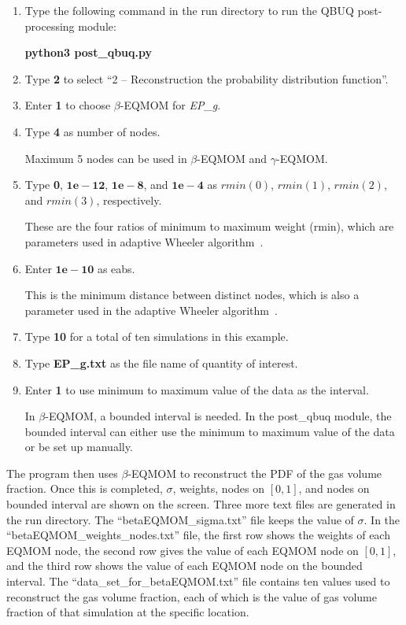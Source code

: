 \documentclass[a4paper,12pt,titlepage]{article}
\begin{document}
\begin{enumerate}[leftmargin=0cm,itemindent=0.5cm]
 \item Type the following command in the run directory to run the QBUQ 
 post-processing module:
 
 \textbf{python3 post\_qbuq.py}
 
 \item Type \textbf{2} to select ``2 -- Reconstruction the probability 
 distribution function''.
 
 \item Enter \textbf{1} to choose $\beta$-EQMOM for \emph{EP\_g}.
 
 \item Type \textbf{4} as number of nodes.
 
 Maximum 5 nodes can be used in $\beta$-EQMOM and $\gamma$-EQMOM.
 
 \item Type \textbf{0}, $\mathbf{1e-12}$, $\mathbf{1e-8}$, and $\mathbf{1e-4}$
 as $rmin(0)$, $rmin(1)$, $rmin(2)$, and $rmin(3)$, respectively.
 
 These are the four ratios of minimum to maximum weight (rmin), which are
 parameters used in adaptive Wheeler algorithm~\cite{YuanFox2011}.
 
 \item Enter $\mathbf{1e-10}$ as eabs.
 
 This is the minimum distance between distinct nodes, which is also a parameter
 used in the adaptive Wheeler algorithm~\cite{YuanFox2011}.
 
 \item Type \textbf{10} for a total of ten simulations in this example.
 
 \item Type \textbf{EP\_g.txt} as the file name of quantity of interest.
 
 \item Enter \textbf{1} to use minimum to maximum value of the data as the 
 interval.
 
 In $\beta$-EQMOM, a bounded interval is needed. In the post\_qbuq module, the
 bounded interval can either use the minimum to maximum value of the data or be
 set up manually.
\end{enumerate}

The program then uses $\beta$-EQMOM to reconstruct the PDF of the gas volume
fraction. Once this is completed, $\sigma$, weights, nodes on $[0,1]$, and nodes
on bounded interval are shown on the screen. Three more text files are generated
in the run directory. The ``betaEQMOM\_sigma.txt'' file keeps the value of
$\sigma$. In the ``betaEQMOM\_weights\_nodes.txt'' file, the first row shows the
weights of each EQMOM node, the second row gives the value of each EQMOM node on
$[0,1]$, and the third row shows the value of each EQMOM node on the bounded
interval. The ``data\_set\_for\_betaEQMOM.txt'' file contains ten values used to
reconstruct the gas volume fraction, each of which is the value of gas volume
fraction of that simulation at the specific location.
\end{document}

